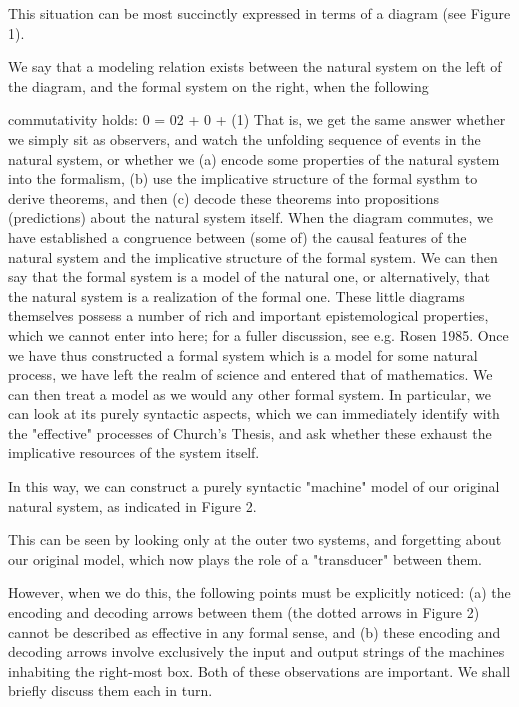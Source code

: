 \documentclass[a4paper,12pt]{article}
\begin{document}
This situation can be most succinctly expressed in terms of a diagram (see Figure 1).

We say that a modeling relation exists between the natural system on the left of the diagram, and the formal system on the right, when the following

commutativity holds:
0 = 02 + 0 + 	(1)
That is, we get the same answer whether we simply sit as observers, and watch the unfolding sequence of events in the natural system, or whether we (a) encode some properties of the natural system into the formalism, (b) use the implicative structure of the formal systhm to derive theorems, and then (c) decode these theorems into propositions (predictions) about the natural system itself.  When the diagram commutes, we have established a congruence between (some of) the causal features of the natural system and the implicative structure of the formal system. We can then say that the formal system is a model of the natural one, or alternatively, that the natural system is a realization of the formal one.
   These little diagrams themselves possess a number of rich and important epistemological properties, which we cannot enter into here; for a fuller discussion, see e.g. Rosen 1985.
Once we have thus constructed a formal system which is a model for
some natural process, we have left the realm of science and entered that
of mathematics. We can then treat a model as we would any other formal
system. In particular, we can look at its purely syntactic aspects, which we can immediately identify with the "effective" processes of Church's Thesis,
and ask whether these exhaust the implicative resources of the system itself.

In this way, we can construct a purely syntactic "machine" model of our original natural system, as indicated in Figure 2.

This can be seen by looking only at the outer two systems, and forgetting about our original model, which now plays the role of a "transducer"
between them.

However, when we do this, the following points must be explicitly noticed: (a) the encoding and decoding arrows between them (the
dotted arrows in Figure 2) cannot be described as effective in any formal
sense, and (b) these encoding and decoding arrows involve exclusively the
input and output strings of the machines inhabiting the right-most box. Both
of these observations are important. We shall briefly discuss them each in
turn.
\end{document}
